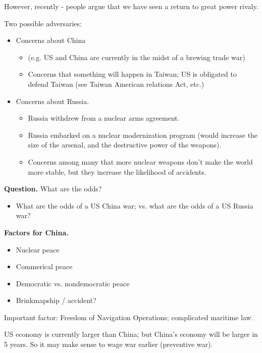 \documentclass{article}
\begin{document}
However, recently - people argue that we have seen a return to great power rivaly.

Two possible adversaries:
\begin{itemize}
  \item Concerns about China
    \begin{itemize}
      \item (e.g. US and China are currently in the midst of a brewing trade war)
      \item Concerns that something will happen in Taiwan; US is obligated to defend Taiwan (see Taiwan American relations Act, etc.)
    \end{itemize}
  \item Concerns about Russia.
    \begin{itemize}
      \item Russia withdrew from a nuclear arms agreement.
      \item Russia embarked on a nuclear modernization program (would increase the size of the arsenal, and the destructive power of the weapons).
      \item Concerns among many that more nuclear weapons don't make the world more stable, but they increase the likelihood of accidents.
    \end{itemize}
\end{itemize}

{\bf Question.} What are the odds?

\begin{itemize}
  \item What are the odds of a US China war; vs. what are the odds of a US Russia war?
\end{itemize}

{\bf Factors for China.}

\begin{itemize}
  \item Nuclear peace
  \item Commerical peace
  \item Democratic vs. nondemocratic peace
  \item Brinkmapship / accident?
\end{itemize}

Important factor: Freedom of Navigation Operations; complicated maritime law.

US economy is currently larger than China; but China's economy will be larger in 5 years.  So it may make sense to wage war earlier (preventive war).
\end{document}
